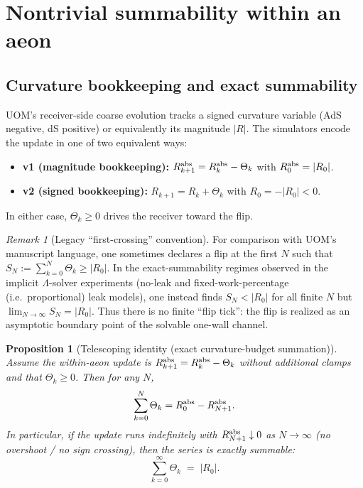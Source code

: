 \documentclass[11pt]{article}
\theoremstyle{definition}
\theoremstyle{plain}
\newtheorem{proposition}[definition]{Proposition}
\theoremstyle{remark}
\newtheorem{remark}[definition]{Remark}
\newcommand{\abs}[1]{\left\lvert #1\right\rvert}
\begin{document}
\section{Nontrivial summability within an aeon}
\label{sec:summability}

\subsection{Curvature bookkeeping and exact summability}
\label{subsec:curvature-bookkeeping}

UOM's receiver-side coarse evolution tracks a signed curvature variable (AdS negative, dS positive) or equivalently
its magnitude $\abs{R}$.
The simulators encode the update in one of two equivalent ways:
\begin{itemize}[leftmargin=1.6em]
\item \textbf{v1 (magnitude bookkeeping):} $R^{\rm abs}_{k+1}=R^{\rm abs}_k-\Theta_k$ with $R^{\rm abs}_0=\abs{R_0}$.
\item \textbf{v2 (signed bookkeeping):} $R_{k+1}=R_k+\Theta_k$ with $R_0=-\abs{R_0}<0$.
\end{itemize}
In either case, $\Theta_k\ge 0$ drives the receiver toward the flip.

\begin{remark}[Legacy ``first-crossing'' convention]
For comparison with UOM's manuscript language, one sometimes declares a flip at the first $N$ such that
$S_N:=\sum_{k=0}^N\Theta_k\ge \abs{R_0}$.
In the exact-summability regimes observed in the implicit $\Lambda$-solver experiments (no-leak and fixed-work-percentage
(i.e.\ proportional) leak models), one instead finds $S_N<\abs{R_0}$ for all finite $N$ but
$\lim_{N\to\infty}S_N=\abs{R_0}$.
Thus there is no finite ``flip tick'': the flip is realized as an asymptotic boundary point of the solvable one-wall
channel.
\end{remark}

\begin{proposition}[Telescoping identity (exact curvature-budget summation)]
Assume the within-aeon update is $R^{\rm abs}_{k+1}=R^{\rm abs}_k-\Theta_k$ without additional clamps and that
$\Theta_k\ge 0$.
Then for any $N$,
\begin{equation}
\sum_{k=0}^N \Theta_k = R^{\rm abs}_0 - R^{\rm abs}_{N+1}.
\label{eq:telescoping}
\end{equation}
In particular, if the update runs indefinitely with $R^{\rm abs}_{N+1}\downarrow 0$ as $N\to\infty$ (no overshoot /
no sign crossing), then the series is \emph{exactly} summable:
\begin{equation}
\sum_{k=0}^{\infty}\Theta_k \;=\; \abs{R_0}.
\label{eq:exact-summability}
\end{equation}
\end{proposition}
\end{document}

